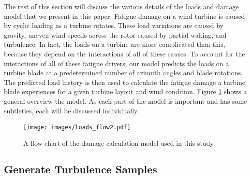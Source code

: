 \documentclass[11pt,letterpaper]{article}
\providecommand{\DIFaddbegin}{} %
\providecommand{\DIFaddend}{} %
\providecommand{\DIFaddbeginFL}{} %
\providecommand{\DIFaddendFL}{} %
\providecommand{\DIFdelbeginFL}{} %
\providecommand{\DIFdelendFL}{} %
\newcommand{\DIFscaledelfig}{0.5}
\newlength{\DIFdelgraphicswidth} %
\newlength{\DIFdelgraphicsheight} %
\newcommand{\DIFaddincludegraphics}[2][]{{\color{blue}\fbox{\DIFOincludegraphics[#1]{#2}}}} %
\newcommand{\DIFdelincludegraphics}[2][]{%
\sbox{\DIFdelgraphicsbox}{\DIFOincludegraphics[#1]{#2}}%
\settoboxwidth{\DIFdelgraphicswidth}{\DIFdelgraphicsbox} %
\settoboxtotalheight{\DIFdelgraphicsheight}{\DIFdelgraphicsbox} %
\scalebox{\DIFscaledelfig}{%
\parbox[b]{\DIFdelgraphicswidth}{\usebox{\DIFdelgraphicsbox}\\[-\baselineskip] \rule{\DIFdelgraphicswidth}{0em}}\llap{\resizebox{\DIFdelgraphicswidth}{\DIFdelgraphicsheight}{%
\setlength{\unitlength}{\DIFdelgraphicswidth}%
\begin{picture}(1,1)%
\thicklines\linethickness{2pt} %
{\color[rgb]{1,0,0}\put(0,0){\framebox(1,1){}}}%
{\color[rgb]{1,0,0}\put(0,0){\line( 1,1){1}}}%
{\color[rgb]{1,0,0}\put(0,1){\line(1,-1){1}}}%
\end{picture}%
}\hspace*{3pt}}} %
} %
\DeclareRobustCommand{\DIFaddbegin}{\DIFOaddbegin \let\includegraphics\DIFaddincludegraphics} %
\DeclareRobustCommand{\DIFaddend}{\DIFOaddend \let\includegraphics\DIFOincludegraphics} %
\DeclareRobustCommand{\DIFaddbeginFL}{\DIFOaddbeginFL \let\includegraphics\DIFaddincludegraphics} %
\DeclareRobustCommand{\DIFaddendFL}{\DIFOaddendFL \let\includegraphics\DIFOincludegraphics} %
\DeclareRobustCommand{\DIFdelbeginFL}{\DIFOdelbeginFL \let\includegraphics\DIFdelincludegraphics} %
\DeclareRobustCommand{\DIFdelendFL}{\DIFOaddendFL \let\includegraphics\DIFOincludegraphics} %
\begin{document}
The rest of this section will discuss the various details of the loads and damage model that we present in this paper. 
Fatigue damage on a wind turbine is caused by cyclic loading as a turbine rotates. These load variations are caused by gravity, uneven wind speeds across the rotor caused by partial waking, and turbulence. In fact, the loads on a turbine are more complicated than this, because they depend on the interactions of all of these causes.
To account for the interactions of all of these fatigue drivers, our model predicts the loads on a turbine blade at a predetermined number of azimuth angles and blade rotations. The predicted load history is then used to calculate the fatigue damage a turbine blade experiences for a given turbine layout and wind condition.
Figure \ref{flow-chart} shows a general overview the model. As each part of the model is important and has some subtleties, each will be discussed individually.
\DIFaddbegin 

\DIFaddend %
\begin{figure}
    \centering
    \DIFdelbeginFL %
\DIFdelendFL \DIFaddbeginFL \texttt{[image: images/loads\_flow2.pdf]}
    \DIFaddendFL \caption{A flow chart of the damage calculation model used in this study.}
    \label{flow-chart}
\end{figure}

\subsection{Generate Turbulence Samples}

\end{document}

